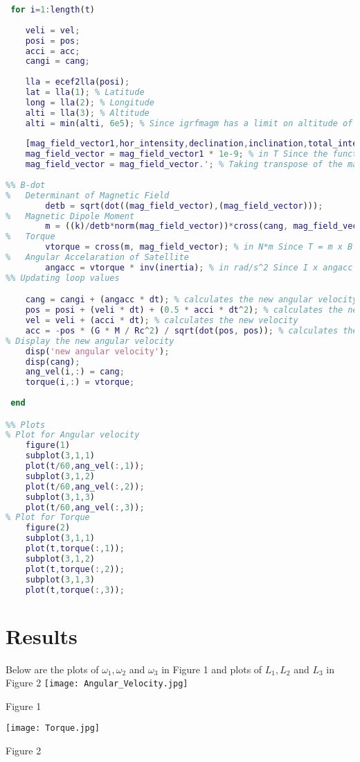 \documentclass[11pt]{article}
\begin{document}
\begin{lstlisting}[language=MATLAB]
%% Main loop
 for i=1:length(t)
     
    veli = vel;
    posi = pos;
    acci = acc;
    cangi = cang;
    
    lla = ecef2lla(posi);
    lat = lla(1); % Latitude
    long = lla(2); % Longitude
    alti = lla(3); % Altitude
    alti = min(alti, 6e5); % Since igrfmagm has a limit on altitude of 6e5
    
    [mag_field_vector1,hor_intensity,declination,inclination,total_intensity] = igrfmagm(alti,lat,long,decyear(2015,7,4),12); % igrfmagm used to calculate the magnetic field of earth at particular position
    mag_field_vector = mag_field_vector1 * 1e-9; % in T Since the function returns the value in nT
    mag_field_vector = mag_field_vector.'; % Taking transpose of the magnetic feild
    
%% B-dot
%   Determinant of Magnetic Field
        detb = sqrt(dot((mag_field_vector),(mag_field_vector)));
%   Magnetic Dipole Moment
        m = ((k)/detb*norm(mag_field_vector))*cross(cang, mag_field_vector); % in A*m^2 Since m = -k (w x b)/||B||
%   Torque
        vtorque = cross(m, mag_field_vector); % in N*m Since T = m x B
%   Angular Accelaration of Satellite
        angacc = vtorque * inv(inertia); % in rad/s^2 Since I x angacc = T
%% Updating loop values

    cang = cangi + (angacc * dt); % calculates the new angular velocity
    pos = posi + (veli * dt) + (0.5 * acci * dt^2); % calculates the new position assuming constant acc for dt time
    vel = veli + (acci * dt); % calculates the new velocity
    acc = -pos * (G * M / Rc^2) / sqrt(dot(pos, pos)); % calculates the new acceleration
% Display the new angular velocity
    disp('new angular velocity');
    disp(cang);
    ang_vel(i,:) = cang;
    torque(i,:) = vtorque;
     
 end

%% Plots
% Plot for Angular velocity
    figure(1)
    subplot(3,1,1)
    plot(t/60,ang_vel(:,1));
    subplot(3,1,2)
    plot(t/60,ang_vel(:,2));
    subplot(3,1,3)
    plot(t/60,ang_vel(:,3));
% Plot for Torque
    figure(2)
    subplot(3,1,1)
    plot(t,torque(:,1));
    subplot(3,1,2)
    plot(t,torque(:,2));
    subplot(3,1,3)
    plot(t,torque(:,3));

\end{lstlisting}
\section{Results}
Below are the plots of $\omega_1,\omega_2$ and $\omega_3$ in Figure 1 and plots of $L_1,L_2$ and $L_3$ in Figure 2
\linebreak
\texttt{[image: Angular\_Velocity.jpg]}
\begin{center}
    Figure 1
\end{center}
\linebreak
\texttt{[image: Torque.jpg]}
\begin{center}
    Figure 2
\end{center}
\end{document}
